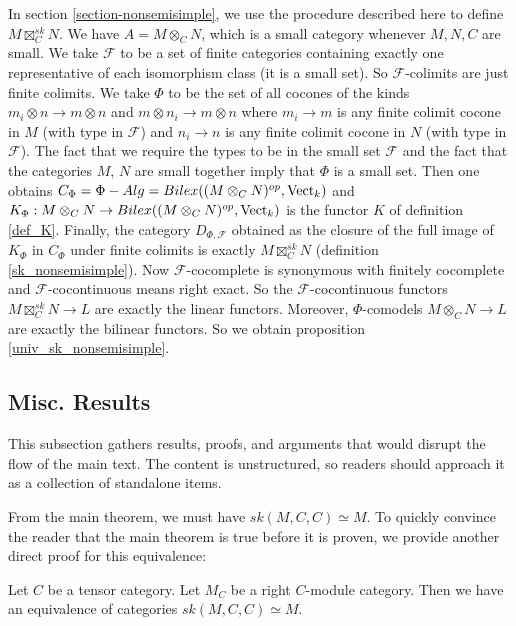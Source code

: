 In section \ref{section-nonsemisimple}, we use the procedure described here to
define $M\boxtimes_C^{sk}N$. We have $A=M\otimes_C N$, which is a small
category whenever $M,N,C$ are small. We take $\mathcal{F}$ to be a set of
finite categories containing exactly one representative of each isomorphism
class (it is a small set). So $\mathcal{F}$-colimits are just finite colimits.
We take $\Phi$ to be the set of all cocones of the kinds $m_i\otimes n\to
m\otimes n$ and $m\otimes n_i\to m\otimes n$ where $m_i\to m$ is any finite
colimit cocone in $M$ (with type in $\mathcal{F}$) and $n_i\to n$ is any
finite colimit cocone in $N$ (with type in $\mathcal{F}$). The fact that we
require the types to be in the small set $\mathcal{F}$ and the fact that the
categories $M$, $N$ are small together imply that $\Phi$ is a small set. Then
one obtains $C_{\Phi}=\Phi-Alg=Bilex((M\otimes_C N)^{op},\operatorname{Vect}_k)$ and
$K_{\Phi}:M\otimes_C N\to Bilex((M\otimes_C N)^{op},\operatorname{Vect}_k)$ is the functor
$K$ of definition \ref{def_K}. Finally, the category $D_{\Phi,\mathcal{F}}$
obtained as the closure of the full image of $K_{\Phi}$ in $C_{\Phi}$ under
finite colimits is exactly $M\boxtimes_C^{sk}N$ (definition
\ref{sk_nonsemisimple}). Now $\mathcal{F}$-cocomplete is synonymous with
finitely cocomplete and $\mathcal{F}$-cocontinuous means right exact. So the
$\mathcal{F}$-cocontinuous functors $M\boxtimes_C^{sk}N\to L$ are exactly the
linear functors. Moreover, $\Phi$-comodels $M\otimes_C N\to L$ are exactly the
bilinear functors. So we obtain proposition \ref{univ_sk_nonsemisimple}.


\subsection{Misc. Results}

\noindent This subsection gathers results, proofs, and arguments that would
disrupt the flow of the main text. The content is unstructured, so readers
should approach it as a collection of standalone items.

\noindent From the main theorem, we must have $sk(M,C,C) \simeq M$. To quickly
convince the reader that the main theorem is true before it is proven, we
provide another direct proof for this equivalence:

\begin{proposition} \label{proposition/degenerated-main-theorem}

  \noindent Let $C$ be a tensor category. Let $M_{C}$ be a right $C$-module
  category. \quad Then we have an equivalence of categories $sk(M,C,C) \simeq
  M$.
\end{proposition}

